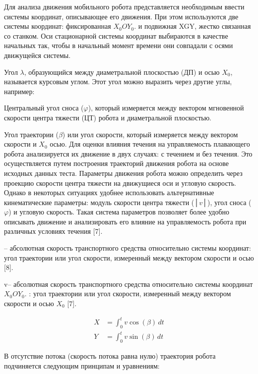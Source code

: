 \begin{multicols}{2}

Для анализа движения мобильного робота представляется необходимым ввести
системы координат, описывающее его движения. При этом используются две
системы координат: фиксированная \(X_{0}OY_{0}\). и подвижная XGY,
жестко связанная со станком. Оси стационарной системы координат
выбираются в качестве начальных так, чтобы в начальный момент времени
они совпадали с осями движущейся системы.

Угол \(\lambda\), образующийся между диаметральной плоскостью (ДП) и
осью \(X_{0}\), называется курсовым углом. Этот угол можно выразить
через другие углы, например:

Центральный угол сноса (\(\varphi\)), который измеряется между вектором
мгновенной скорости центра тяжести (ЦТ) робота и диаметральной
плоскостью.

Угол траектории (\(\beta\)) или угол скорости, который измеряется между
вектором скорости и \(X_{0}\) осью. Для оценки влияния течения на
управляемость плавающего робота анализируется их движение в двух
случаях: с течением и без течения. Это осуществляется путем построения
траекторий движения робота на основе исходных данных теста. Параметры
движения робота можно определить через проекцию скорости центра тяжести
на движущиеся оси и угловую скорость. Однако в некоторых ситуациях
удобнее использовать альтернативные кинематические параметры: модуль
скорости центра тяжести (│\(v\)│), угол сноса (\(\varphi\)) и угловую
скорость. Такая система параметров позволяет более удобно описывать
движение и анализировать его влияние на управляемость робота при
различных условиях течения {[}7{]}.

-- абсолютная скорость транспортного средства относительно системы
координат: угол траектории или угол скорости, измеренный между вектором
скорости и осью {[}8{]}.

v-- абсолютная скорость транспортного средства относительно системы
координат \(X_{0}OY_{0}\). : угол траектории или угол скорости,
измеренный между вектором скорости и осью \(X_{0}\) {[}7{]}.

\begin{equation}
  \begin{aligned}
  X &= \int_{0}^{t} v \cos(\beta) \, dt \\
  Y &= \int_{0}^{t} v \sin(\beta) \, dt
  \end{aligned}
  \end{equation}
  

В отсутствие потока (скорость потока равна нулю) траектория робота
подчиняется следующим принципам и уравнениям:
\end{multicols}

